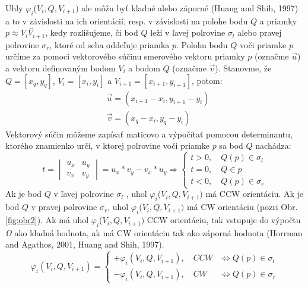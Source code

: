 \documentclass[11pt]{article}
\begin{document}
Uhly $\varphi_i$($V_i, Q, V_{i+1})$ ale môžu byť kladné alebo záporné (Huang and Shih, 1997) a to v závislosti na ich orientácií, resp. v závislosti na polohe bodu $Q$ a priamky $p \approx \overleftrightarrow{V_iV_{i+1}}$, kedy rozlišujeme, či bod $Q$ leží v ľavej polrovine $\sigma_l$ alebo pravej polrovine $\sigma_r$, ktoré od seba oddeľuje priamka $p$. \newline Polohu bodu $Q$ voči priamke $p$ určíme za pomoci vektorového súčinu smerového vektoru \linebreak priamky $p$ (označme $\vec{u}$) a vektoru definovaným bodom $V_i$ a bodom $Q$ (označme $\vec{v}$).
\newline Stanovme, že $Q=[x_q,y_q]$, $V_i=[x_i,y_i]$ a $V_{i+1}=[x_{i+1},y_{i+1}]$, potom:
\begin{align}
    \nonumber&\vec{u}=(x_{i+1}-x_i,y_{i+1}-y_i)\\
    \nonumber&\vec{v}=(x_q-x_i,y_q-y_i)
\end{align}
\noindent Vektorový súčin môžeme zapísať maticovo a výpočítať pomocou determinantu, ktorého znamienko určí, v ktorej polrovine voči priamke $p$ sa bod $Q$ nachádza:
\begin{equation*}
t=\begin{vmatrix} u_x & u_y \\ v_x & v_y  \end{vmatrix}=u_x*v_y-v_x*u_y \Rightarrow
\begin{cases}
    t>0, \quad Q(p)  \in \sigma_l \\
    t=0, \quad Q  \in p\\
    t<0, \quad Q(p)  \in \sigma_r
\end{cases}
\end{equation*}
Ak je bod $Q$ v ľavej polrovine $\sigma_l$ , uhol $\varphi_i$($V_i, Q, V_{i+1})$ má CCW orientáciu. Ak je bod $Q$ v pravej polrovine $\sigma_r$, uhol $\varphi_i$($V_i, Q, V_{i+1})$ má CW orientáciu (pozri Obr. \ref{fig:obr2}).\newline
Ak má uhol $\varphi_i$($V_i, Q, V_{i+1})$ CCW orientáciu, tak vstupuje do výpočtu $\varOmega$ ako kladná hodnota, ak má CW orientáciu tak ako záporná hodnota (Horrman and Agathos, 2001, Huang and Shih, 1997).
\begin{equation*}
\varphi_i(V_i, Q, V_{i+1})=
\begin{cases}
    +\varphi_i(V_i, Q, V_{i+1}), \quad CCW &\iff  Q(p) \in \sigma_l\\
    -\varphi_i(V_i, Q, V_{i+1}), \quad CW &\iff Q(p) \in \sigma_r
\end{cases}
\end{equation*}
\end{document}
